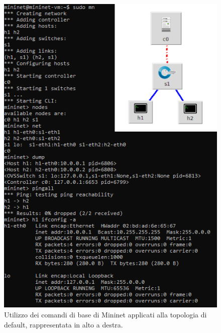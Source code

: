 \begin{figure} [h!]
	\centering
	\includegraphics[width=0.97\linewidth]{../immagini/mn/4b}
	\caption[Comandi di base su Mininet]{Utilizzo dei comandi di base di Mininet applicati alla topologia di default, rappresentata in alto a destra.}
	\label{fig:4b}
\end{figure}
